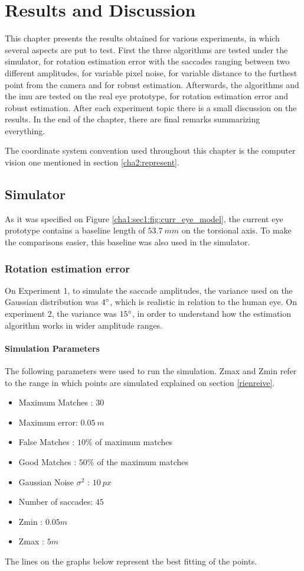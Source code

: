 
\chapter{Results and Discussion}
\label{cha4:results}

This chapter presents the results obtained for various experiments, in which several aspects are put to test. First the three algorithms are tested under the simulator, for rotation estimation error with the saccades ranging between two different amplitudes, for variable pixel noise, for variable distance to the furthest point from the camera and for robust estimation. Afterwards, the algorithms and the \acrshort{imu} are tested on the real eye prototype, for rotation estimation error and robust estimation. After each experiment topic there is a small discussion on the results. In the end of the chapter, there are final remarks summarizing everything.

The coordinate system convention used throughout this chapter is the computer vision one mentioned in section \ref{cha2:represent}. 

\section{Simulator}
As it was specified on Figure \ref{cha1:sec1:fig:curr_eye_model}, the current eye prototype contains a baseline length of $53.7 \ mm$ on the torsional axis. To make the comparisons easier, this baseline was also used in the simulator.
\subsection{Rotation estimation error}
\label{reiovniorevn}
On Experiment 1, to simulate the saccade amplitudes, the variance used on the Gaussian distribution was $4 \degree$, which is realistic in relation to the human eye. On experiment 2, the variance was $15 \degree$, in order to understand how the estimation algorithm works in wider amplitude ranges.
\subsubsection{Simulation Parameters}
The following parameters were used to run the simulation. Zmax and Zmin refer to the range in which points are simulated explained on section \ref{rienreive}.
\begin{itemize}
	\item Maximum Matches : $30$
	\item Maximum error: $0.05 \ m$
	\item False Matches : $10 \%$ of maximum matches
	\item Good Matches : $50 \%$ of the maximum matches
	\item Gaussian Noise $\sigma^2$ : $10 \ px$
	\item Number of saccades: $45$
	\item Zmin : $0.05 m$
	\item Zmax : $5 m$
\end{itemize}
The lines on the graphs below represent the best fitting of the points.
